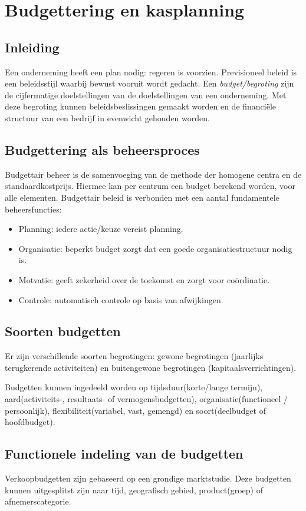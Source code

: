 \documentclass[../../samenvatting.tex]{subfiles}
\begin{document}
\section{Budgettering en kasplanning}
\subsection{Inleiding}
Een onderneming heeft een plan nodig: regeren is voorzien. Previsioneel beleid is een beleidsstijl waarbij bewust vooruit wordt gedacht. Een \emph{budget/begroting} zijn de cijfermatige doelstellingen van de doelstellingen van een onderneming. Met deze begroting kunnen beleidsbeslissingen gemaakt worden en de financiële structuur van een bedrijf in evenwicht gehouden worden.

\subsection{Budgettering als beheersproces}
Budgettair beheer is de samenvoeging van de methode der homogene centra en de standaardkostprijs. Hiermee kan per centrum een budget berekend worden, voor alle elementen. Budgettair beleid is verbonden met een aantal fundamentele beheersfuncties:
\begin{itemize}
    \item Planning: iedere actie/keuze vereist planning. 
    \item Organisatie: beperkt budget zorgt dat een goede organisatiestructuur nodig is.
    \item Motvatie: geeft zekerheid over de toekomst en zorgt voor coördinatie.
    \item Controle: automatisch controle op basis van afwijkingen.
\end{itemize}

\subsection{Soorten budgetten}
Er zijn verschillende soorten begrotingen: gewone begrotingen (jaarlijks terugkerende activiteiten) en buitengewone begrotingen (kapitaalsverrichtingen).

Budgetten kunnen ingedeeld worden op tijdsduur(korte/lange termijn), aard(activiteits-, resultaats- of vermogensbudgetten), organisatie(functioneel / persoonlijk), flexibiliteit(variabel, vast, gemengd) en soort(deelbudget of hoofdbudget).

\subsection{Functionele indeling van de budgetten}
Verkoopbudgetten zijn gebaseerd op een grondige marktstudie. Deze budgetten kunnen uitgesplitst zijn naar tijd, geografisch gebied, product(groep) of afnemerscategorie.
\end{document}
